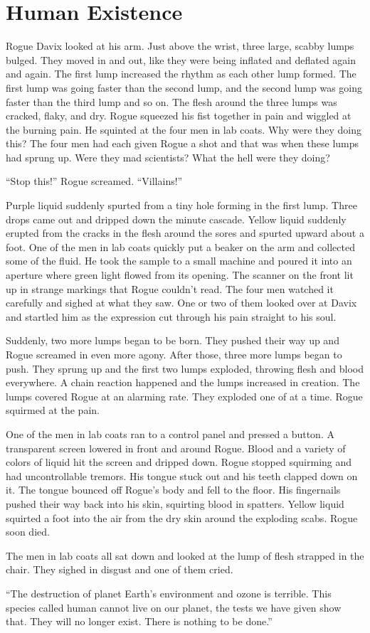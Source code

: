 \chapter{Human Existence}

Rogue Davix looked at his arm. Just above the wrist, three large, scabby
lumps bulged. They moved in and out, like they were being inflated and
deflated again and again. The first lump increased the rhythm as each
other lump formed. The first lump was going faster than the second lump,
and the second lump was going faster than the third lump and so on. The
flesh around the three lumps was cracked, flaky, and dry. Rogue squeezed
his fist together in pain and wiggled at the burning pain. He squinted
at the four men in lab coats. Why were they doing this? The four men had
each given Rogue a shot and that was when these lumps had sprung
up. Were they mad scientists? What the hell were they doing?

``Stop this!'' Rogue screamed. ``Villains!''

Purple liquid suddenly spurted from a tiny hole forming in the first
lump. Three drops came out and dripped down the minute cascade. Yellow
liquid suddenly erupted from the cracks in the flesh around the sores
and spurted upward about a foot. One of the men in lab coats quickly put
a beaker on the arm and collected some of the fluid. He took the sample
to a small machine and poured it into an aperture where green light
flowed from its opening. The scanner on the front lit up in strange
markings that Rogue couldn't read. The four men watched it carefully and
sighed at what they saw. One or two of them looked over at Davix and
startled him as the expression cut through his pain straight to his
soul.

Suddenly, two more lumps began to be born. They pushed their way up and
Rogue screamed in even more agony. After those, three more lumps began
to push. They sprung up and the first two lumps exploded, throwing flesh
and blood everywhere. A chain reaction happened and the lumps increased
in creation. The lumps covered Rogue at an alarming rate. They exploded
one of at a time. Rogue squirmed at the pain.

One of the men in lab coats ran to a control panel and pressed a
button. A transparent screen lowered in front and around Rogue. Blood
and a variety of colors of liquid hit the screen and dripped down. Rogue
stopped squirming and had uncontrollable tremors. His tongue stuck out
and his teeth clapped down on it. The tongue bounced off Rogue's body
and fell to the floor. His fingernails pushed their way back into his
skin, squirting blood in spatters. Yellow liquid squirted a foot into
the air from the dry skin around the exploding scabs. Rogue soon died.

The men in lab coats all sat down and looked at the lump of flesh
strapped in the chair. They sighed in disgust and one of them cried.

``The destruction of planet Earth's environment and ozone is
terrible. This species called human cannot live on our planet, the tests
we have given show that. They will no longer exist. There is nothing to
be done.''
